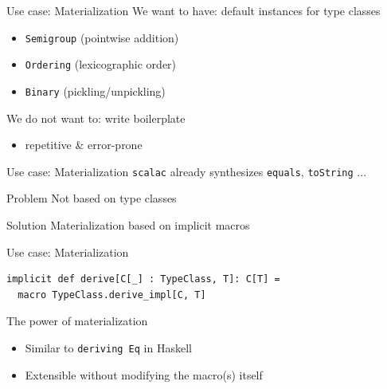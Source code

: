 \documentclass{beamer}
\newcommand\demoslide{
  {
    \setbeamertemplate{background}{}
    \begin{frame}[plain]
      \begin{center}\Large\bfseries Demo\end{center}
    \end{frame}
  }
}
\begin{document}
\begin{frame}{Use case: Materialization}
  We want to have: default instances for type classes
  \begin{itemize}
    \item \texttt{Semigroup} (pointwise addition)
    \item \texttt{Ordering} (lexicographic order)
    \item \texttt{Binary} (pickling/unpickling)
  \end{itemize}

  \vspace{1em}
  We do not want to: write boilerplate
  \begin{itemize}
    \item repetitive \& error-prone
  \end{itemize}
\end{frame}

\begin{frame}{Use case: Materialization}
  \texttt{scalac} already synthesizes \texttt{equals}, \texttt{toString} ...

  \vspace{1em}
  \begin{alertblock}{Problem}
    Not based on type classes
  \end{alertblock}

  \vspace{1em}
  \begin{exampleblock}{Solution}
    Materialization based on implicit macros
  \end{exampleblock}
\end{frame}

\begin{frame}[fragile]{Use case: Materialization}
  \begin{verbatim}
implicit def derive[C[_] : TypeClass, T]: C[T] =
  macro TypeClass.derive_impl[C, T]
  \end{verbatim}
\end{frame}


\begin{frame}{The power of materialization}
  \begin{itemize}
    \item Similar to \texttt{deriving Eq} in Haskell
    \item Extensible without modifying the macro(s) itself
  \end{itemize}
\end{frame}
\end{document}
